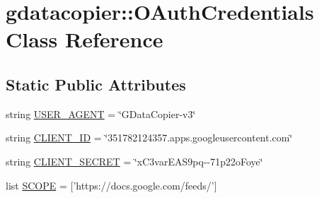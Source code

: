 \hypertarget{classgdatacopier_1_1_o_auth_credentials}{\section{gdatacopier\-:\-:\-O\-Auth\-Credentials \-Class \-Reference}
\label{classgdatacopier_1_1_o_auth_credentials}
}
\subsection*{\-Static \-Public \-Attributes}
\begin{DoxyCompactItemize}
\item 
string \hyperlink{classgdatacopier_1_1_o_auth_credentials_a70092cec199a5af5fd617580eac40a6b}{\-U\-S\-E\-R\-\_\-\-A\-G\-E\-N\-T} = \char`\"{}\-G\-Data\-Copier-\/v3\char`\"{}
\item 
string \hyperlink{classgdatacopier_1_1_o_auth_credentials_a163ae90afac416c406f84e23599c56a3}{\-C\-L\-I\-E\-N\-T\-\_\-\-I\-D} = \char`\"{}351782124357.apps.\-googleusercontent.\-com\char`\"{}
\item 
string \hyperlink{classgdatacopier_1_1_o_auth_credentials_afc547b419fa42751c59c7f14088013eb}{\-C\-L\-I\-E\-N\-T\-\_\-\-S\-E\-C\-R\-E\-T} = \char`\"{}x\-C3var\-E\-A\-S9pq-\/-\/71p22o\-Foye\char`\"{}
\item 
list \hyperlink{classgdatacopier_1_1_o_auth_credentials_a5f2ea4009689417028c750fdff048711}{\-S\-C\-O\-P\-E} = \mbox{[}'https\-://docs.\-google.\-com/feeds/'\mbox{]}
\end{DoxyCompactItemize}


